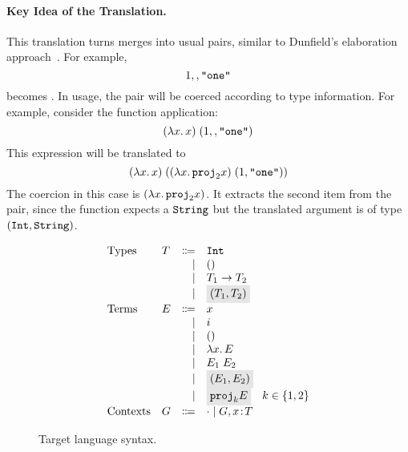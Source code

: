 
\paragraph{Key Idea of the Translation.}
This translation turns merges into usual pairs, similar to Dunfield's
elaboration approach~\cite{dunfield2014elaborating}.
For example, \[ 1 \mergeop \code{"one"} \] becomes 
{}. In usage, the pair will be coerced according to type
information. For example, consider the function application: \[ \app {(\lamty x
{\code{String}} x)} {(1 \mergeop \code{"one"})} \] This expression will be translated to \[ \app
{(\lamty x {\code{String}} x)} {(\app {(\lamty x {\pair {\code{Int}} {\code{String}}} {\proj 2 x})}
{\pair 1 {\code{"one"}}})} \] The coercion in this case is $(\lamty x {\pair
{\code{Int}} {\code{String}}} {\proj 2 x})$. It extracts the second item from the pair, since
the function expects a $\code{String}$ but the translated argument is of type $\pair
{\code{Int}} {\code{String}}$.


\begin{figure}[t]
  \[
    \begin{array}{llrl}
      \text{Types}    & T & \Coloneqq & \code{Int} \\
                      &   & \mid      & \unit \\
                      &   & \mid      & {T_1} \to {T_2} \\
                      &   & \mid      & \highlight {$ \pair {T_1} {T_2} $} \\
      \text{Terms}    & E & \Coloneqq & x \\
                      &   & \mid      & i \\
                      &   & \mid      & \unit \\
                      &   & \mid      & \lamty x T E \\
                      &   & \mid      & \app {E_1} {E_2} \\
                      &   & \mid      & \highlight {$ \pair {E_1} {E_2} $} \\
                      &   & \mid      & \highlight {$ \proj k E $} \quad k \in \{ 1, 2 \} \\
      \text{Contexts} & G & \Coloneqq & \cdot \mid G, x \oftype T \\
    \end{array}
  \]
  \caption{Target language syntax.}
  \label{fig:f-syntax}
\end{figure}

